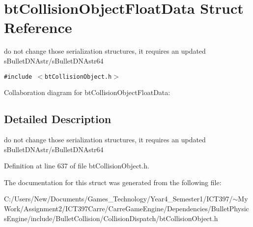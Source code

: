 \hypertarget{structbt_collision_object_float_data}{
\section{btCollisionObjectFloatData Struct Reference}
\label{structbt_collision_object_float_data}
}
do not change those serialization structures, it requires an updated sBulletDNAstr/sBulletDNAstr64  


{\tt \#include $<$btCollisionObject.h$>$}

Collaboration diagram for btCollisionObjectFloatData:

\subsection{Detailed Description}
do not change those serialization structures, it requires an updated sBulletDNAstr/sBulletDNAstr64 

Definition at line 637 of file btCollisionObject.h.

The documentation for this struct was generated from the following file:\begin{CompactItemize}
\item 
C:/Users/New/Documents/Games\_\-Technology/Year4\_\-Semester1/ICT397/$\sim$My Work/Assignment2/ICT397Carre/CarreGameEngine/Dependencies/BulletPhysicsEngine/include/BulletCollision/CollisionDispatch/btCollisionObject.h\end{CompactItemize}
